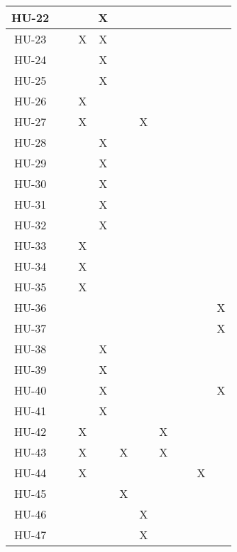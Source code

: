 \begin{table}[!ht]
\begin{tabular}{|c|c|c|c|c|c|c|c|c|c|}
        HU-22 & ~ & ~ & X & ~ & ~ & ~ & ~ & ~ & ~ \\ \hline
        HU-23 & ~ & X & X & ~ & ~ & ~ & ~ & ~ & ~ \\ \hline
        HU-24 & ~ & ~ & X & ~ & ~ & ~ & ~ & ~ & ~ \\ \hline
        HU-25 & ~ & ~ & X & ~ & ~ & ~ & ~ & ~ & ~ \\ \hline
        HU-26 & ~ & X & ~ & ~ & ~ & ~ & ~ & ~ & ~ \\ \hline
        HU-27 & ~ & X & ~ & ~ & X & ~ & ~ & ~ & ~ \\ \hline
        HU-28 & ~ & ~ & X & ~ & ~ & ~ & ~ & ~ & ~ \\ \hline
        HU-29 & ~ & ~ & X & ~ & ~ & ~ & ~ & ~ & ~ \\ \hline
        HU-30 & ~ & ~ & X & ~ & ~ & ~ & ~ & ~ & ~ \\ \hline
        HU-31 & ~ & ~ & X & ~ & ~ & ~ & ~ & ~ & ~ \\ \hline
        HU-32 & ~ & ~ & X & ~ & ~ & ~ & ~ & ~ & ~ \\ \hline
        HU-33 & ~ & X & ~ & ~ & ~ & ~ & ~ & ~ & ~ \\ \hline
        HU-34 & ~ & X & ~ & ~ & ~ & ~ & ~ & ~ & ~ \\ \hline
        HU-35 & ~ & X & ~ & ~ & ~ & ~ & ~ & ~ & ~ \\ \hline
        HU-36 & ~ & ~ & ~ & ~ & ~ & ~ & ~ & ~ & X \\ \hline
        HU-37 & ~ & ~ & ~ & ~ & ~ & ~ & ~ & ~ & X \\ \hline
        HU-38 & ~ & ~ & X & ~ & ~ & ~ & ~ & ~ & ~ \\ \hline
        HU-39 & ~ & ~ & X & ~ & ~ & ~ & ~ & ~ & ~ \\ \hline
        HU-40 & ~ & ~ & X & ~ & ~ & ~ & ~ & ~ & X \\ \hline
        HU-41 & ~ & ~ & X & ~ & ~ & ~ & ~ & ~ & ~ \\ \hline
        HU-42 & ~ & X & ~ & ~ & ~ & X & ~ & ~ & ~ \\ \hline
        HU-43 & ~ & X & ~ & X & ~ & X & ~ & ~ & ~ \\ \hline
        HU-44 & ~ & X & ~ & ~ & ~ & ~ & ~ & X & ~ \\ \hline
        HU-45 & ~ & ~ & ~ & X & ~ & ~ & ~ & ~ & ~ \\ \hline
        HU-46 & ~ & ~ & ~ & ~ & X & ~ & ~ & ~ & ~ \\ \hline
        HU-47 & ~ & ~ & ~ & ~ & X & ~ & ~ & ~ & ~ \\ \hline

\end{tabular}
\end{table}
